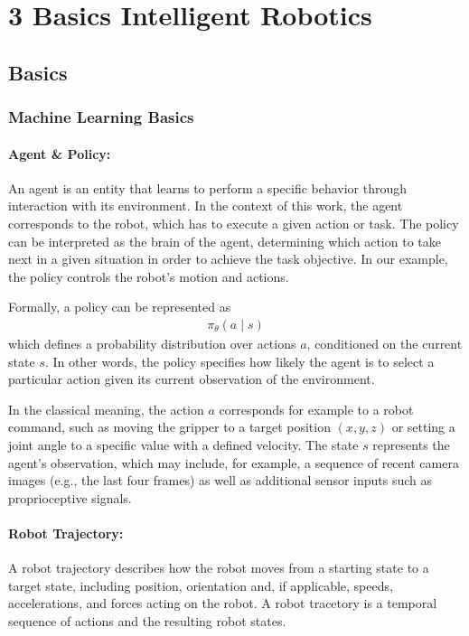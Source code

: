 \chapter{3	Basics Intelligent Robotics}


\section{Basics}

\subsection{Machine Learning Basics}
\subsubsection{Agent \& Policy:}

An agent is an entity that learns to perform a specific behavior through interaction with its environment. In the context of this work, the agent corresponds to the robot, which has to execute a given action or task. The policy can be interpreted as the brain of the agent, determining which action to take next in a given situation in order to achieve the task objective. In our example, the policy controls the robot's motion and actions.  

Formally, a policy can be represented as  
\begin{align}
	\pi_\theta(a \mid s)  
\end{align}
which defines a probability distribution over actions $a$, conditioned on the current state $s$. In other words, the policy specifies how likely the agent is to select a particular action given its current observation of the environment.  

In the classical meaning, the action $a$ corresponds for example to a robot command, such as moving the gripper to a target position $(x, y, z)$ or setting a joint angle to a specific value with a defined velocity. The state $s$ represents the agent’s observation, which may include, for example, a sequence of recent camera images (e.g., the last four frames) as well as additional sensor inputs such as proprioceptive signals.

\subsubsection{Robot Trajectory:}

A robot trajectory describes how the robot moves from a starting state to a target state, including position, orientation and, if applicable, speeds, accelerations, and forces acting on the robot. A robot tracetory is a temporal sequence of actions and the resulting robot states.


